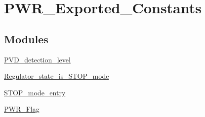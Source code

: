 \hypertarget{group__PWR__Exported__Constants}{
\section{PWR\_\-Exported\_\-Constants}
\label{group__PWR__Exported__Constants}
}
\subsection*{Modules}
\begin{DoxyCompactItemize}
\item 
\hyperlink{group__PVD__detection__level}{PVD\_\-detection\_\-level}
\item 
\hyperlink{group__Regulator__state__is__STOP__mode}{Regulator\_\-state\_\-is\_\-STOP\_\-mode}
\item 
\hyperlink{group__STOP__mode__entry}{STOP\_\-mode\_\-entry}
\item 
\hyperlink{group__PWR__Flag}{PWR\_\-Flag}
\end{DoxyCompactItemize}
